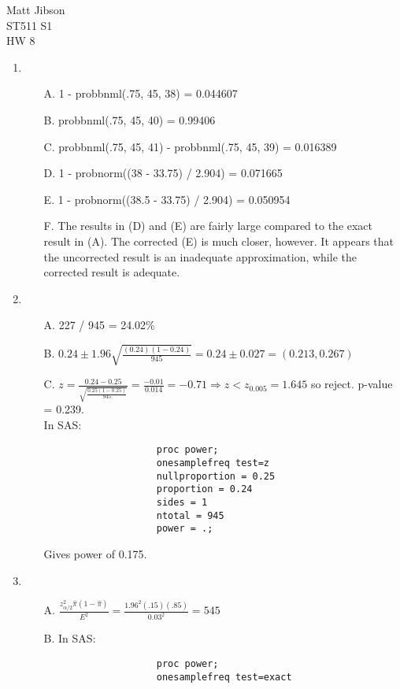 \documentclass{article}
\begin{document}
\begin{flushright}
Matt Jibson \\
ST511 S1\\
HW 8
\end{flushright}

\begin{enumerate}
	\item
		\begin{itemize}
			\item[A.] 1 - probbnml(.75, 45, 38) = 0.044607
			\item[B.] probbnml(.75, 45, 40) = 0.99406
			\item[C.] probbnml(.75, 45, 41) - probbnml(.75, 45, 39) = 0.016389
			\item[D.] 1 - probnorm((38 - 33.75) / 2.904) = 0.071665
			\item[E.] 1 - probnorm((38.5 - 33.75) / 2.904) = 0.050954
			\item[F.] The results in (D) and (E) are fairly large compared to the exact result in (A). The corrected (E) is much closer, however. It appears that the uncorrected result is an inadequate approximation, while the corrected result is adequate.
		\end{itemize}
	\item
		\begin{itemize}
			\item[A.] 227 / 945 = 24.02\%
			\item[B.] $0.24 \pm 1.96 \sqrt{\frac{(0.24)(1-0.24)}{945}} = 0.24 \pm 0.027 = (0.213, 0.267)$
			\item[C.] $z = \frac{0.24 - 0.25}{\sqrt{\frac{0.25 (1-0.25)}{945}}} = \frac{-0.01}{0.014} = -0.71 \Rightarrow z < z_{0.005} = 1.645$ so reject. p-value = 0.239. \\
				In SAS:
				\begin{verbatim}
					proc power;
					onesamplefreq test=z
					nullproportion = 0.25
					proportion = 0.24
					sides = 1
					ntotal = 945
					power = .;
				\end{verbatim}
				Gives power of 0.175.
		\end{itemize}
	\item
		\begin{itemize}
			\item[A.] $\frac{z_{\alpha/2}^2 \hat{\pi} (1 - \hat{\pi})}{E^2} = \frac{1.96^2 (.15) (.85)}{0.03^2} = 545$
			\item[B.] In SAS:
				\begin{verbatim}
					proc power;
					onesamplefreq test=exact

\end{verbatim}
\end{itemize}
\end{enumerate}
\end{document}
